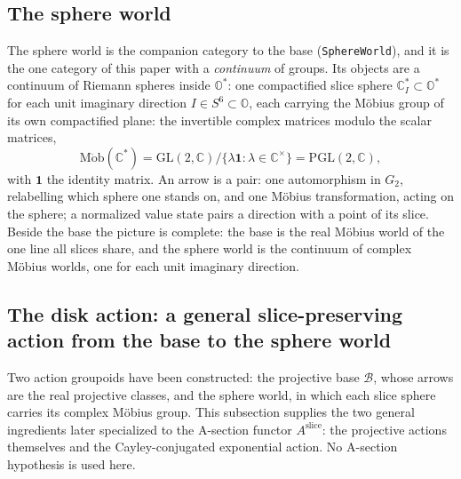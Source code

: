 \documentclass[11pt]{article}
\newcommand{\OO}{\mathbb{O}}
\newcommand{\CC}{\mathbb{C}}
\theoremstyle{plain}
\theoremstyle{definition}
\theoremstyle{remark}
\begin{document}
\subsection*{The sphere world}

The sphere world is the companion category to the base
\textup{(}\texttt{SphereWorld}\textup{)}, and it is the one category of this
paper with a \emph{continuum} of groups. Its objects are a continuum of
Riemann spheres inside $\OO^{*}$: one compactified slice sphere
$\CC_I^{*}\subset\OO^{*}$ for each unit imaginary direction
$I\in S^6\subset\OO$, each carrying the M\"obius group of its own
compactified plane: the invertible complex matrices modulo the scalar
matrices,
\[
  \operatorname{M\ddot ob}(\CC^{*})
  =\mathrm{GL}(2,\CC)\big/\bigl\{\lambda\mathbf 1:\lambda\in\CC^{\times}\bigr\}
  =\mathrm{PGL}(2,\CC),
\]
with $\mathbf 1$ the identity matrix.
An arrow is a pair: one
automorphism in $G_2$, relabelling which sphere one stands on, and one
M\"obius transformation, acting on the sphere; a normalized value state pairs a
direction with a point of its slice. Beside the base the picture is
complete: the base is the real M\"obius world of the one line all slices
share, and the sphere world is the continuum of complex M\"obius worlds, one
for each unit imaginary direction.

\subsection*{The disk action: a general slice-preserving action from the
base to the sphere world}

Two action groupoids have been constructed: the projective base
$\mathcal B$, whose arrows are the real projective classes, and the sphere
world, in which each slice sphere carries its complex M\"obius group.  This
subsection supplies the two general ingredients later specialized to the
A-section functor $A^{\mathrm{slice}}$: the projective actions themselves
and the Cayley-conjugated exponential action.  No A-section hypothesis is
used here.
\end{document}
